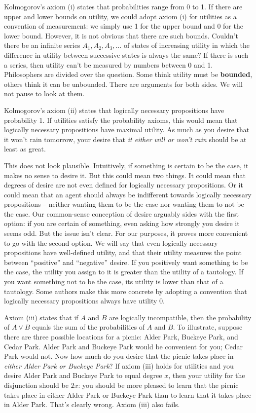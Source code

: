 Kolmogorov's axiom (i) states that probabilities range from 0 to 1. If there are
upper and lower bounds on utility, we could adopt axiom (i) for utilities as a
convention of measurement: we simply use 1 for the upper bound and 0 for the
lower bound. However, it is not obvious that there are such bounds. Couldn't
there be an infinite series $A_1, A_2, A_3, \ldots$ of states of increasing
utility in which the difference in utility between successive states is always
the same? If there is such a series, then utility can't be measured by numbers
between 0 and 1. Philosophers are divided over the question. Some think utility
must be \textbf{bounded}, others think it can be unbounded. There are arguments
for both sides. We will not pause to look at them.

Kolmogorov's axiom (ii) states that logically necessary propositions have
probability 1. If utilities satisfy the probability axioms, this would mean that
logically necessary propositions have maximal utility. As much as you desire
that it won't rain tomorrow, your desire that \emph{it either will or won't
  rain} should be at least as great.

This does not look plausible. Intuitively, if something is certain to be the
case, it makes no sense to desire it. But this could mean two things. It could
mean that degrees of desire are not even defined for logically necessary
propositions. Or it could mean that an agent should always be indifferent
towards logically necessary propositions -- neither wanting them to be the case
nor wanting them to not be the case. Our common-sense conception of desire
arguably sides with the first option: if you are certain of something, even
asking how strongly you desire it seems odd. But the issue isn't clear. For our
purposes, it proves more convenient to go with the second option. We will say
that even logically necessary propositions have well-defined utility, and that
their utility measures the point between ``positive'' and ``negative'' desire.
If you positively want something to be the case, the utility you assign to it is
greater than the utility of a tautology. If you want something not to be the
case, its utility is lower than that of a tautology. Some authors make this more
concrete by adopting a convention that logically necessary propositions always
have utility 0.\label{utility0}

Axiom (iii) states that if $A$ and $B$ are logically incompatible, then the
probability of $A\lor B$ equals the sum of the probabilities of $A$ and $B$. To
illustrate, suppose there are three possible locations for a picnic: Alder Park,
Buckeye Park, and Cedar Park. Alder Park and Buckeye Park would be convenient
for you; Cedar Park would not. Now how much do you desire that the picnic takes
place in \emph{either Alder Park or Buckeye Park}? If axiom (iii) holds for
utilities and you desire Alder Park and Buckeye Park to equal degree $x$,
then your utility for the disjunction should be $2x$: you should be more pleased
to learn that the picnic takes place in either Alder Park or Buckeye Park than
to learn that it takes place in Alder Park. That's clearly wrong. Axiom (iii)
also fails.

